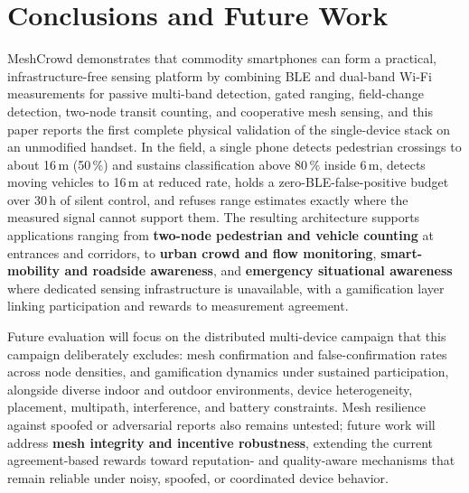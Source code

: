 \documentclass[journal,10pt]{IEEEtran}
\begin{document}
\section{Conclusions and Future Work}
MeshCrowd demonstrates that commodity smartphones can form a practical,
infrastructure-free sensing platform by combining BLE and dual-band Wi-Fi
measurements for passive multi-band detection, gated ranging, field-change
detection, two-node transit counting, and cooperative mesh sensing, and this
paper reports the first complete physical validation of the single-device
stack on an unmodified handset. In the field, a single phone detects
pedestrian crossings to about 16\,m (50\,\%) and sustains classification above 80\,\% inside 6\,m, detects moving vehicles to 16\,m at reduced rate, holds a
zero-BLE-false-positive budget over 30\,h of silent control, and refuses
range estimates exactly where the measured signal cannot support them. The
resulting architecture supports applications ranging from \textbf{two-node
pedestrian and vehicle counting} at entrances and corridors, to \textbf{urban
crowd and flow monitoring}, \textbf{smart-mobility and roadside awareness},
and \textbf{emergency situational awareness} where dedicated sensing
infrastructure is unavailable, with a gamification layer linking
participation and rewards to measurement agreement.

Future evaluation will focus on the distributed multi-device campaign that
this campaign deliberately excludes: mesh confirmation and
false-confirmation rates across node densities, and gamification dynamics
under sustained participation, alongside diverse indoor and outdoor
environments, device heterogeneity, placement, multipath, interference, and
battery constraints. Mesh resilience against spoofed or adversarial reports
also remains untested; future work will address \textbf{mesh integrity and
incentive robustness}, extending the current agreement-based rewards toward
reputation- and quality-aware mechanisms that remain reliable under noisy,
spoofed, or coordinated device behavior.
\end{document}
